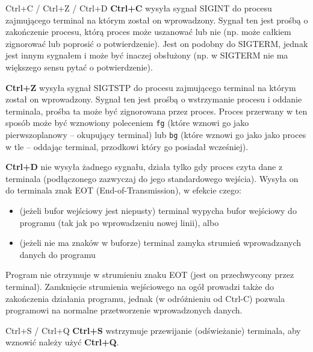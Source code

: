 \begin{ProTip}[breakable]{Ctrl+C / Ctrl+Z / Ctrl+D}
\textbf{Ctrl+C} wysyła sygnał SIGINT do procesu zajmującego terminal na którym został on wprowadzony. Sygnał ten jest prośbą o zakończenie procesu, którą proces może uszanować lub nie (np. może całkiem zignorować lub poprosić o potwierdzenie). Jest on podobny do SIGTERM, jednak jest innym sygnałem i może być inaczej obsłużony (np. w SIGTERM nie ma większego sensu pytać o potwierdzenie).

\vspace{6pt}\textbf{Ctrl+Z} wysyła sygnał SIGTSTP do procesu zajmującego terminal na którym został on wprowadzony. Sygnał ten jest prośbą o wstrzymanie procesu i oddanie terminala, prośba ta może być zignorowana przez proces. Proces przerwany w ten sposób może być wznowiony poleceniem \Verb#fg# (które wznowi go jako pierwszoplanowy – okupujący terminal) lub \Verb#bg# (które wznowi go jako jako proces w tle – oddając terminal, przodkowi który go posiadał wcześniej).

\vspace{6pt}\textbf{Ctrl+D} nie wysyła żadnego sygnału, działa tylko gdy proces czyta dane z terminala (podłączonego zazwyczaj do jego standardowego wejścia). Wysyła on do terminala znak EOT (End-of-Transmission), w efekcie czego:
\begin{itemize}
	\item (jeżeli bufor wejściowy jest niepusty) terminal wypycha bufor wejściowy do programu (tak jak po wprowadzeniu nowej linii), albo
	\item (jeżeli nie ma znaków w buforze) terminal zamyka strumień wprowadzanych danych do programu
\end{itemize}
Program nie otrzymuje w strumieniu znaku EOT (jest on przechwycony przez terminal).
Zamknięcie strumienia wejściowego na ogół prowadzi także do zakończenia działania programu, jednak (w odróżnieniu od Ctrl-C) pozwala programowi na normalne przetworzenie wprowadzonych danych.
\end{ProTip}

\begin{ProTip}[breakable]{Ctrl+S / Ctrl+Q}
\textbf{Ctrl+S} wstrzymuje przewijanie (odświeżanie) terminala, aby wznowić należy użyć \textbf{Ctrl+Q}.
\end{ProTip}

